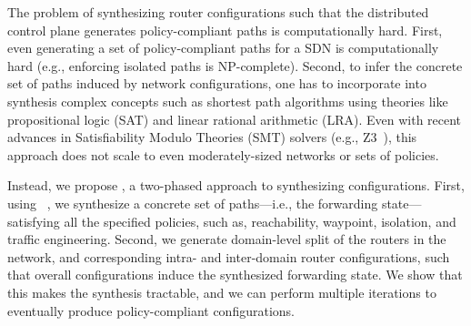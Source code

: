

The problem of synthesizing router configurations
such that the distributed control plane  
generates policy-compliant paths 
is computationally hard. 
First, even generating a set of policy-compliant 
paths for a SDN  is 
computationally hard (e.g., enforcing isolated
paths is NP-complete). 
Second, to infer the concrete
set of paths induced by network configurations, 
one has to incorporate
into synthesis
complex concepts such as shortest path algorithms
using theories like propositional logic (SAT) 
and linear rational
arithmetic (LRA). Even with recent 
advances in Satisfiability Modulo Theories
(SMT) solvers (e.g., Z3~\cite{z3}), 
this approach does not scale to
even moderately-sized networks or 
sets of policies.


Instead, we propose \name, a two-phased approach to synthesizing
configurations.  First, using \genesis~\cite{genesis}, we synthesize a
concrete set of paths---i.e., the forwarding state---satisfying all
the specified policies, such as, reachability, waypoint, isolation,
and traffic engineering.
Second, we generate domain-level split of the routers in the network,
and corresponding intra- and inter-domain router configurations, such
that overall configurations induce the synthesized forwarding
state. We show that this makes the synthesis tractable, and we can
perform multiple iterations to eventually produce policy-compliant
configurations.

